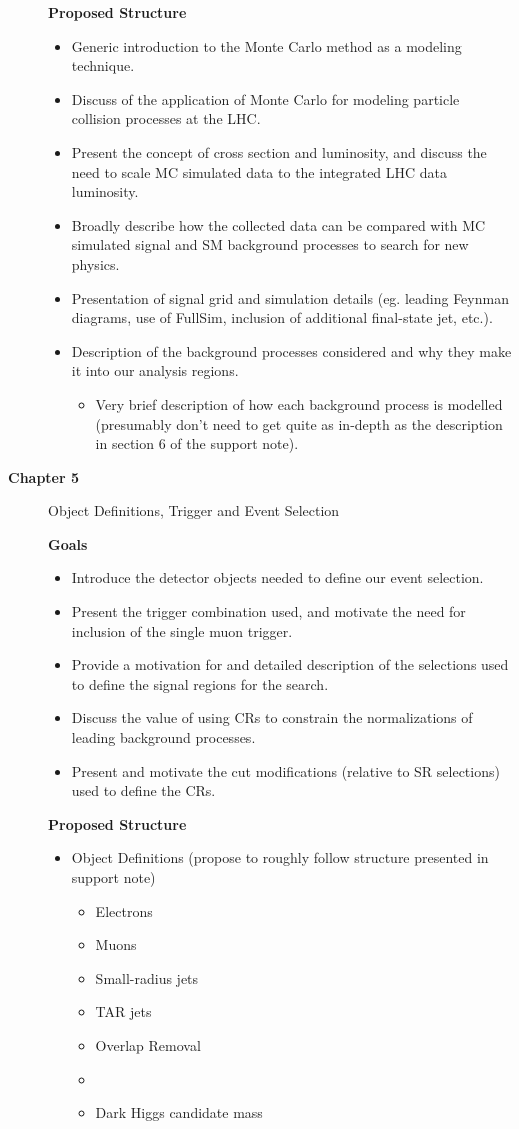 \begin{description}
\textbf{Proposed Structure}
\begin{itemize}
\item Generic introduction to the Monte Carlo method as a modeling technique.
\item Discuss of the application of Monte Carlo for modeling particle collision processes at the LHC. 
\item Present the concept of cross section and luminosity, and discuss the need to scale MC simulated data to the integrated LHC data luminosity. 
\item Broadly describe how the collected data can be compared with MC simulated signal and SM background processes to search for new physics.
\item Presentation of signal grid and simulation details (eg. leading Feynman diagrams, use of FullSim, inclusion of additional final-state jet, etc.).
\item Description of the background processes considered and why they make it into our analysis regions.
\begin{itemize}
\item Very brief description of how each background process is modelled (presumably don't need to get quite as in-depth as the description in section 6 of the support note). 
\end{itemize}
\end{itemize}

\item[\textbf{Chapter 5}] Object Definitions, Trigger and Event Selection

\textbf{Goals}
\begin{itemize}
\item Introduce the detector objects needed to define our event selection.
\item Present the trigger combination used, and motivate the need for inclusion of the single muon trigger.
\item Provide a motivation for and detailed description of the selections used to define the signal regions for the search.
\item Discuss the value of using CRs to constrain the normalizations of leading background processes.
\item Present and motivate the cut modifications (relative to SR selections) used to define the CRs.
\end{itemize}

\textbf{Proposed Structure}
\begin{itemize}
\item Object Definitions (propose to roughly follow structure presented in support note)
\begin{itemize}
\item Electrons
\item Muons
\item Small-radius \aktfour jets
\item TAR jets
\item Overlap Removal
\item \met
\item Dark Higgs candidate mass \ms
\end{itemize}


\end{itemize}
\end{description}
